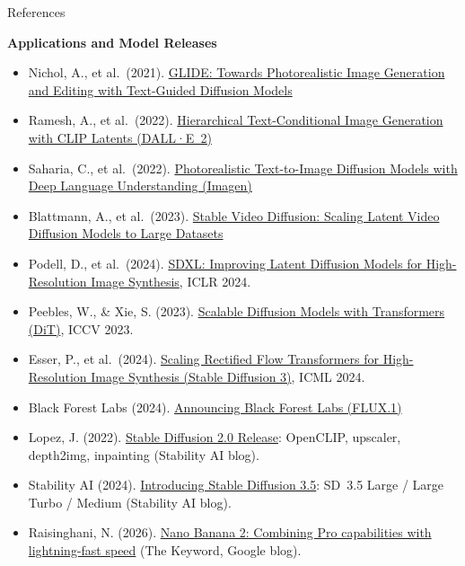 \begin{frame}[allowframebreaks]{References}
\framebreak

\textbf{Applications and Model Releases}
\begin{itemize}
    \item Nichol, A., et al.\ (2021). \href{https://arxiv.org/abs/2112.10741}{GLIDE: Towards Photorealistic Image Generation and Editing with Text-Guided Diffusion Models}
    \item Ramesh, A., et al.\ (2022). \href{https://arxiv.org/abs/2204.06125}{Hierarchical Text-Conditional Image Generation with CLIP Latents (DALL·E~2)}
    \item Saharia, C., et al.\ (2022). \href{https://arxiv.org/abs/2205.11487}{Photorealistic Text-to-Image Diffusion Models with Deep Language Understanding (Imagen)}
    \item Blattmann, A., et al.\ (2023). \href{https://arxiv.org/abs/2311.15127}{Stable Video Diffusion: Scaling Latent Video Diffusion Models to Large Datasets}
    \item Podell, D., et al.\ (2024). \href{https://arxiv.org/abs/2307.01952}{SDXL: Improving Latent Diffusion Models for High-Resolution Image Synthesis}, ICLR 2024.
    \item Peebles, W., \& Xie, S. (2023). \href{https://arxiv.org/abs/2212.09748}{Scalable Diffusion Models with Transformers (DiT)}, ICCV 2023.
    \item Esser, P., et al.\ (2024). \href{https://arxiv.org/abs/2403.03206}{Scaling Rectified Flow Transformers for High-Resolution Image Synthesis (Stable Diffusion 3)}, ICML 2024.
    \item Black Forest Labs (2024). \href{https://bfl.ai/announcing-black-forest-labs/}{Announcing Black Forest Labs (FLUX.1)}
    \item Lopez, J. (2022). \href{https://stability.ai/news-updates/stable-diffusion-v2-release}{Stable Diffusion 2.0 Release}: OpenCLIP, upscaler, depth2img, inpainting (Stability AI blog).
    \item Stability AI (2024). \href{https://stability.ai/news-updates/introducing-stable-diffusion-3-5}{Introducing Stable Diffusion 3.5}: SD~3.5 Large / Large Turbo / Medium (Stability AI blog).
    \item Raisinghani, N. (2026). \href{https://blog.google/innovation-and-ai/technology/ai/nano-banana-2/}{Nano Banana 2: Combining Pro capabilities with lightning-fast speed} (The Keyword, Google blog).
\end{itemize}
\end{frame}
